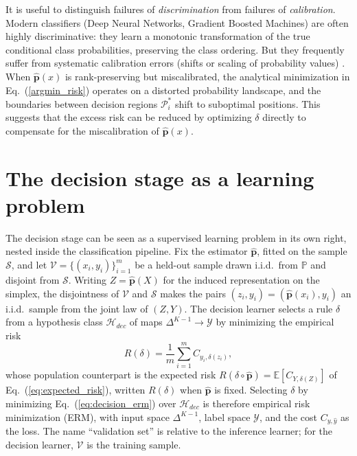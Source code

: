 It is useful to distinguish failures of \textit{discrimination} from failures of \textit{calibration}. Modern classifiers (Deep Neural Networks, Gradient Boosted Machines) are often highly discriminative: they learn a monotonic transformation of the true conditional class probabilities, preserving the class ordering. But they frequently suffer from systematic calibration errors (shifts or scaling of probability values) \citep{niculescuMizil2005predicting,guo2017calibration}. When $\hat{\mathbf{p}}(x)$ is rank-preserving but miscalibrated, the analytical minimization in Eq.~(\ref{argmin_risk}) operates on a distorted probability landscape, and the boundaries between decision regions $\mathcal{P}_i^*$ shift to suboptimal positions. This suggests that the excess risk can be reduced by optimizing $\delta$ directly to compensate for the miscalibration of $\hat{\mathbf{p}}(x)$.

\section{The decision stage as a learning problem}\label{sec:decision_learning}

The decision stage can be seen as a supervised learning problem in its own right, nested inside the classification pipeline. Fix the estimator $\hat{\mathbf{p}}$, fitted on the sample $\mathcal{S}$, and let $\mathcal{V} = \{(x_i, y_i)\}_{i=1}^m$ be a held-out sample drawn i.i.d.\ from $\mathbb{P}$ and disjoint from $\mathcal{S}$. Writing $Z = \hat{\mathbf{p}}(X)$ for the induced representation on the simplex, the disjointness of $\mathcal{V}$ and $\mathcal{S}$ makes the pairs $(z_i, y_i) = (\hat{\mathbf{p}}(x_i), y_i)$ an i.i.d.\ sample from the joint law of $(Z, Y)$. The decision learner selects a rule $\delta$ from a hypothesis class $\mathcal{H}_{dec}$ of maps $\Delta^{K-1} \to \mathcal{Y}$ by minimizing the empirical risk
\begin{equation}\label{eq:decision_erm}
    \hat{R}(\delta) = \frac{1}{m} \sum_{i=1}^m C_{y_i, \delta(z_i)},
\end{equation}
whose population counterpart is the expected risk $R(\delta \circ \hat{\mathbf{p}}) = \mathbb{E}[C_{Y, \delta(Z)}]$ of Eq.~(\ref{eq:expected_risk}), written $R(\delta)$ when $\hat{\mathbf{p}}$ is fixed. Selecting $\delta$ by minimizing Eq.~(\ref{eq:decision_erm}) over $\mathcal{H}_{dec}$ is therefore empirical risk minimization (ERM), with input space $\Delta^{K-1}$, label space $\mathcal{Y}$, and the cost $C_{y, \hat{y}}$ as the loss. The name ``validation set'' is relative to the inference learner; for the decision learner, $\mathcal{V}$ is the training sample.

